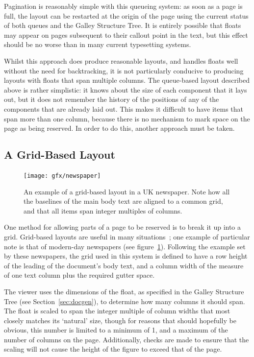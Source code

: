 Pagination is reasonably simple with this queueing system: as soon as a page is full, the layout can be restarted at the origin of the page using the current status of both queues and the Galley Structure Tree. It is entirely possible that floats may appear on pages subsequent to their callout point in the text, but this effect should be no worse than in many current typesetting systems.

Whilst this approach does produce reasonable layouts, and handles floats well without the need for backtracking, it is not particularly conducive to producing layouts with floats that span multiple columns. The queue-based layout described above is rather simplistic: it knows about the size of each component that it lays out, but it does not remember the history of the positions of any of the components that are already laid out. This makes it difficult to have items that span more than one column, because there is no mechanism to mark space on the page as being reserved. In order to do this, another approach must be taken.

\subsection{A Grid-Based Layout}
\label{sec:gridlayout}

\begin{figure}
    \texttt{[image: gfx/newspaper]}
    \caption[An example of a grid-based layout]{An example of a grid-based layout in a UK newspaper. Note how all the baselines of the main body text are aligned to a common grid, and that all items span integer multiples of columns.}
    \label{fig:gridlayout}
\end{figure}

One method for allowing parts of a page to be reserved is to break it up into a grid. Grid-based layouts are useful in many situations~\cite{Collier1991,Bringhurst2008}; one example of particular note is that of modern-day newspapers (see figure~\ref{fig:gridlayout}). Following the example set by these newspapers, the grid used in this system is defined to have a row height of the \gls{leading} of the document's body text, and a column width of the \gls{measure} of one text column plus the required gutter space.



The viewer uses the dimensions of the float, as specified in the Galley Structure Tree (see Section~\ref{sec:docgen}), to determine how many columns it should span. The float is scaled to span the integer multiple of column widths that most closely matches its `natural' size, though for reasons that should hopefully be obvious, this number is limited to a minimum of 1, and a maximum of the number of columns on the page. Additionally, checks are made to ensure that the scaling will not cause the height of the figure to exceed that of the page.

